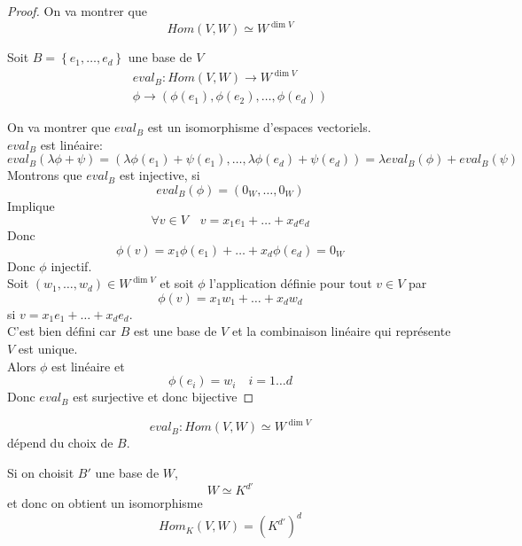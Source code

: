 \documentclass[../main.tex]{subfiles}
\begin{document}
\begin{proof}
	On va montrer que 
	\[ 
		Hom( V,W) \simeq W^{\dim V}
	\]


	Soit $B = \left\{ e_1, \ldots, e_d \right\} $ une base de $V$ 
	\begin{align*}
	eval_B: Hom( V,W)  \to W^{\dim V}\\
	\phi \to ( \phi( e_1), \phi( e_2) , \ldots, \phi( e_d)  ) 
	\end{align*}
	
On va montrer que $eval_B$ est un isomorphisme d'espaces vectoriels.\\
$eval_B$ est linéaire: 
\[ 
	eval_B ( \lambda\phi+ \psi) = ( \lambda\phi( e_1) + \psi( e_1) , \ldots, \lambda\phi( e_d) + \psi( e_d) )  = \lambda eval_B( \phi) + eval_B ( \psi) 
\]
Montrons que 
$eval_B$ est injective, si
\[ 
	eval_B( \phi) = ( 0_W, \ldots, 0_W) 
\]
Implique
\[ 
\forall v \in V \quad v = x_1e_1+ \ldots + x_d e_d
\]
Donc
\[ 
	\phi( v) = x_1 \phi( e_1) + \ldots + x_d \phi( e_d) = 0_W
\]
Donc $\phi$ injectif.\\
Soit $( w_1, \ldots, w_d) \in W^{\dim V} $ et soit $\phi$ l'application définie pour tout $v \in V$ par
\[ 
	\phi( v) = x_1w_1 + \ldots + x_d w_d
\]
si $v= x_1e_1 + \ldots +x_d e_d$.\\
C'est bien défini car $B$ est une base de $V$ et la combinaison linéaire qui représente $V$ est unique.\\
Alors $\phi$ est linéaire et 
\[ 
	\phi( e_i) = w_i \quad i= 1\ldots d
\]
Donc $eval_B$ est surjective et donc bijective
\end{proof}
\begin{rmq}
	 \[ 
		 eval_B: Hom( V,W) \simeq W^{\dim V}
	\]
	dépend du choix de $B$.
\end{rmq}
\begin{rmq}
Si on choisit $B'$ une base de $W$, 
\[ 
W \simeq K^{d'}
\]
et donc on obtient un isomorphisme 
\[ 
	Hom_K ( V,W) = ( K^{d'} )^{d}
\]

\end{rmq}
\end{document}
